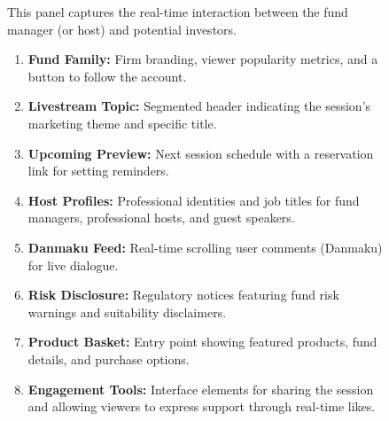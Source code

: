 \begin{landscape}
\begin{figure}[p]
\begin{minipage}[b][\appheight][c]{0.35\textwidth}
    \end{minipage}
    \hfill
    \begin{minipage}[b][\appheight][c]{0.50\textwidth}
        \begin{tcolorbox}[height=\appheight, colback=red!5!white, colframe=red!75!black, 
            title=In-stream Livestreaming Interface, valign=center, arc=0pt, outer arc=0pt, boxrule=1.5pt]
            \small
            This panel captures the real-time interaction between the fund manager (or host) and potential investors.
            \begin{enumerate}[label=\textbf{(\arabic*)}, leftmargin=*, itemsep=2pt]
                \item \textbf{Fund Family:} Firm branding, viewer popularity metrics, and a button to follow the account.
                \item \textbf{Livestream Topic:} Segmented header indicating the session's marketing theme and specific title.
                \item \textbf{Upcoming Preview:} Next session schedule with a reservation link for setting reminders.
                \item \textbf{Host Profiles:} Professional identities and job titles for fund managers, professional hosts, and guest speakers.
                \item \textbf{Danmaku Feed:} Real-time scrolling user comments (Danmaku) for live dialogue.
                \item \textbf{Risk Disclosure:} Regulatory notices featuring fund risk warnings and suitability disclaimers.
                \item \textbf{Product Basket:} Entry point showing featured products, fund details, and purchase options.
                \item \textbf{Engagement Tools:} Interface elements for sharing the session and allowing viewers to express support through real-time likes.
            \end{enumerate}
        \end{tcolorbox}
    \end{minipage}
    \vspace{10pt}
\end{figure}
\end{landscape}

